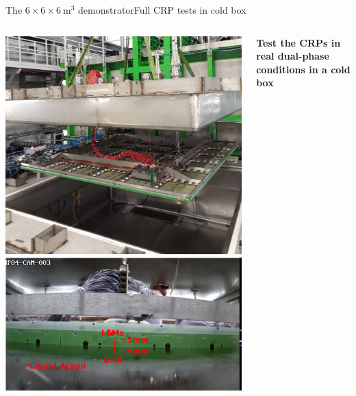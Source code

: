 \documentclass[10pt]{beamer}
\begin{document}
    \begin{frame}{The \texorpdfstring{$6 \times 6 \times \SI{6}{\meter\cubed}$}{666} demonstrator}{Full CRP tests in cold box}
   		\begin{columns}
   			\begin{column}{0.4\textwidth}
   				\includegraphics[width=\textwidth]{figures/666/crp_inserting_coldbox.png}\\
   				\includegraphics[width=\textwidth]{figures/666/in_coldbox.png}
    		\end{column}
    		\begin{column}{0.6\textwidth}
    			\begin{scriptsize}
	    			\textbf{Test the CRPs in real dual-phase conditions in a cold box}\\
	    			

\end{scriptsize}
\end{column}
\end{columns}
\end{frame}
\end{document}
